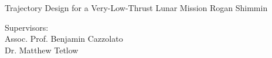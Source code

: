 
\begin{titlepage}

  \thispagestyle{empty}\noindent
  \vfill

  \begin{center}
  \huge{Trajectory Design for a Very-Low-Thrust Lunar Mission}%
  \vfill\noindent
  \Large{Rogan Shimmin}
  \vfill

  \small{Supervisors:\\
  Assoc. Prof. Benjamin Cazzolato\\%
  Dr. Matthew Tetlow\\%
  }
  \end{center}


\end{titlepage}
